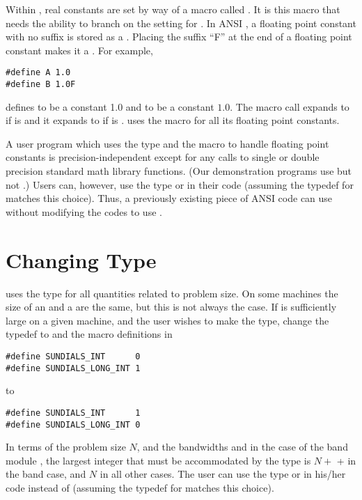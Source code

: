 Within {\sundials}, real constants are set by way of a macro called
.  It is this macro that needs the ability to branch on the
setting for .  In ANSI {\C}, a floating point constant with no
suffix is stored as a .  Placing the suffix ``F'' at the
end of a floating point constant makes it a . For example,
\begin{verbatim}
#define A 1.0
#define B 1.0F
\end{verbatim}
defines  to be a  constant 1.0 and  to be a
 constant $1.0$. The macro call 
expands to  if  is  and it expands to
 if  is . {\sundials} uses the  macro for
all its floating point constants. 

A user program which uses the type  and the  macro
to handle floating point constants is precision-independent except for
any calls to single or double precision standard math library
functions.  (Our demonstration programs use  but not
.)  Users can, however, use the type  or
 in their code (assuming the typedef for  matches
this choice).  Thus, a previously existing piece of ANSI {\C} code can use
{\sundials} without modifying the codes to use .

\section{Changing Type }

{\sundials} uses the type  for all quantities related to problem
size.  On some machines the size of an  and a 
are the same, but this is not always the case. 
If  is sufficiently large on a given machine, and the user wishes
to make  the  type, change the typedef
 to 
and the macro definitions in 
\begin{verbatim}
#define SUNDIALS_INT      0
#define SUNDIALS_LONG_INT 1
\end{verbatim}
to
\begin{verbatim}
#define SUNDIALS_INT      1
#define SUNDIALS_LONG_INT 0
\end{verbatim}
In terms of the problem size $N$, and the bandwidths  and  
in the case of the band module {\band}, the largest integer that must be 
accommodated by the  type is $N + $  +  in the 
band case, and $N$ in all other cases. The user can use the type  
or  in his/her code instead of  (assuming the 
typedef for  matches this choice).